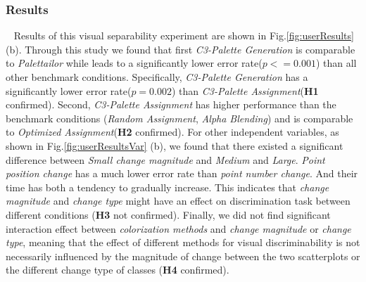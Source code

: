 \subsubsection{Results}
\
\newline
Results of this visual separability experiment are shown in Fig.\ref{fig:userResults} (b).
Through this study we found that first \emph{C3-Palette Generation} is comparable to \emph{Palettailor} while leads to a significantly lower error rate(\emph{$p<=0.001$}) than all other benchmark conditions. Specifically, \emph{C3-Palette Generation} has a significantly lower error rate(\emph{$p=0.002$}) than \emph{C3-Palette Assignment}(\textbf{H1} confirmed).
Second, \emph{C3-Palette Assignment} has higher performance than the benchmark conditions (\emph{Random Assignment}, \emph{Alpha Blending}) and is comparable to \emph{Optimized Assignment}(\textbf{H2} confirmed).
For other independent variables, as shown in Fig.\ref{fig:userResultsVar} (b), we found that there existed a significant difference between \emph{Small change magnitude} and \emph{Medium} and \emph{Large}. \emph{Point position change} has a much lower error rate than \emph{point number change}. And their time has both a tendency to gradually increase. This indicates that \emph{change magnitude} and \emph{change type} might have an effect on discrimination task between different conditions (\textbf{H3} not confirmed).
Finally, we did not find significant interaction effect between \emph{colorization methods} and \emph{change magnitude} or \emph{change type}, meaning that the effect of different methods for visual discriminability is not
necessarily influenced by the magnitude of change between the two scatterplots or the different change type of classes (\textbf{H4} confirmed).
\vspace{.3em}
